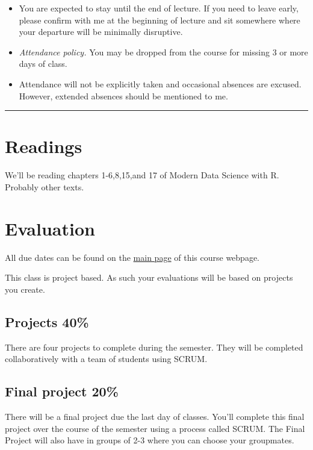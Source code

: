 \documentclass[
  letterpaper,
  DIV=11,
  numbers=noendperiod]{scrartcl}
\providecommand{\tightlist}{%
  \setlength{\itemsep}{0pt}\setlength{\parskip}{0pt}}\usepackage{longtable,booktabs,array}
\begin{document}
\begin{itemize}
\tightlist
\item
  You are expected to stay until the end of lecture. If you need to
  leave early, please confirm with me at the beginning of lecture and
  sit somewhere where your departure will be minimally disruptive.
\item
  \emph{Attendance policy.} You may be dropped from the course for
  missing 3 or more days of class.
\item
  Attendance will not be explicitly taken and occasional absences are
  excused. However, extended absences should be mentioned to me.
\end{itemize}

\begin{center}\rule{0.5\linewidth}{0.5pt}\end{center}

\hypertarget{readings}{%
\section{Readings}\label{readings}}

We'll be reading chapters 1-6,8,15,and 17 of Modern Data Science with R.
Probably other texts.

\hypertarget{evaluation}{%
\section{Evaluation}\label{evaluation}}

All due dates can be found on the \href{../index.html}{main page} of
this course webpage.

This class is project based. As such your evaluations will be based on
projects you create.

\hypertarget{projects-40}{%
\subsection{Projects 40\%}\label{projects-40}}

There are four projects to complete during the semester. They will be
completed collaboratively with a team of students using SCRUM.

\hypertarget{final-project-20}{%
\subsection{Final project 20\%}\label{final-project-20}}

There will be a final project due the last day of classes. You'll
complete this final project over the course of the semester using a
process called SCRUM. The Final Project will also have in groups of 2-3
where you can choose your groupmates.
\end{document}
